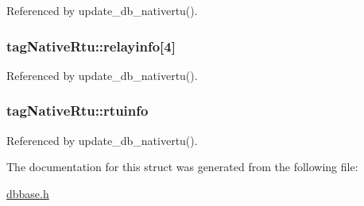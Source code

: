 Referenced by update\-\_\-db\-\_\-nativertu().

\hypertarget{structtagNativeRtu_a1a9ac94c9e3ccb6676c4cc60ab67b287}{
\subsubsection[{relayinfo}]{ tag\-Native\-Rtu\-::relayinfo\mbox{[}4\mbox{]}}}\label{structtagNativeRtu_a1a9ac94c9e3ccb6676c4cc60ab67b287}


Referenced by update\-\_\-db\-\_\-nativertu().

\hypertarget{structtagNativeRtu_afc100edeb735a0a051804fca82eda4e6}{
\subsubsection[{rtuinfo}]{ tag\-Native\-Rtu\-::rtuinfo}}\label{structtagNativeRtu_afc100edeb735a0a051804fca82eda4e6}


Referenced by update\-\_\-db\-\_\-nativertu().



The documentation for this struct was generated from the following file\-:\begin{DoxyCompactItemize}
\item 
\hyperlink{dbbase_8h}{dbbase.\-h}\end{DoxyCompactItemize}
